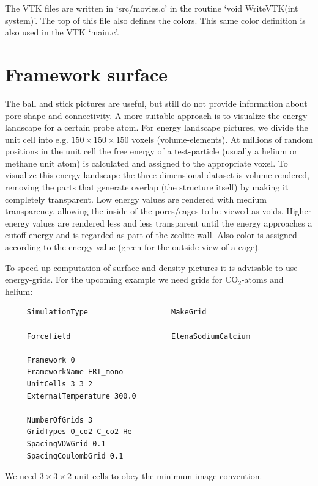 The VTK files are written in `src/movies.c' in the routine `void WriteVTK(int system)'. The top of this file also
defines the colors. This same color definition is also used in the VTK `main.c'.

\section{Framework surface}

The ball and stick pictures are useful, but still do not provide information about pore shape and connectivity.
A more suitable approach is to visualize the energy landscape for a certain probe atom.
For energy landscape pictures, we divide the unit cell
into e.g. $150\times150\times150$ voxels (volume-elements).
At millions of random positions in the unit cell
the free energy of a test-particle (usually a helium or methane unit atom) is calculated
and assigned to the appropriate voxel. To visualize this energy landscape
the three-dimensional dataset is volume rendered,
removing the parts that generate overlap (the structure itself) by making it
completely transparent.
Low energy values are rendered with medium transparency, allowing the inside of the pores/cages to
be viewed as voids. Higher energy values are rendered less and less
transparent until the energy approaches
a cutoff energy and is regarded as part of the zeolite wall. Also color is assigned according
to the energy value (green for the outside view of a cage).

To speed up computation of surface and density pictures it is advisable to use energy-grids. For the upcoming example
we need grids for CO$_2$-atoms and helium:

\begin{verbatim}
     SimulationType                   MakeGrid

     Forcefield                       ElenaSodiumCalcium

     Framework 0
     FrameworkName ERI_mono
     UnitCells 3 3 2
     ExternalTemperature 300.0

     NumberOfGrids 3
     GridTypes O_co2 C_co2 He
     SpacingVDWGrid 0.1
     SpacingCoulombGrid 0.1
\end{verbatim}
We need $3\times3\times2$ unit cells to obey the minimum-image convention.

